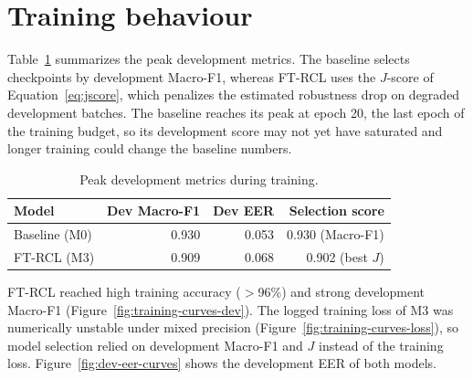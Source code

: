 \section{Training behaviour}

Table~\ref{tab:training-peak} summarizes the peak development metrics. The baseline selects checkpoints by development Macro-F1, whereas FT-RCL uses the $J$-score of Equation~\eqref{eq:jscore}, which penalizes the estimated robustness drop on degraded development batches. The baseline reaches its peak at epoch 20, the last epoch of the training budget, so its development score may not yet have saturated and longer training could change the baseline numbers.

\begin{table}[htbp]
\centering
\caption{Peak development metrics during training.}
\label{tab:training-peak}
\begin{tabular}{@{}lrrr@{}}
\toprule
Model & Dev Macro-F1 & Dev EER & Selection score \\
\midrule
Baseline (M0) & 0.930 & 0.053 & 0.930 (Macro-F1) \\
FT-RCL (M3)   & 0.909 & 0.068 & 0.902 (best $J$) \\
\bottomrule
\end{tabular}
\end{table}

FT-RCL reached high training accuracy ($>$96\%) and strong development Macro-F1 (Figure~\ref{fig:training-curves-dev}). The logged training loss of M3 was numerically unstable under mixed precision (Figure~\ref{fig:training-curves-loss}), so model selection relied on development Macro-F1 and $J$ instead of the training loss. Figure~\ref{fig:dev-eer-curves} shows the development EER of both models.




